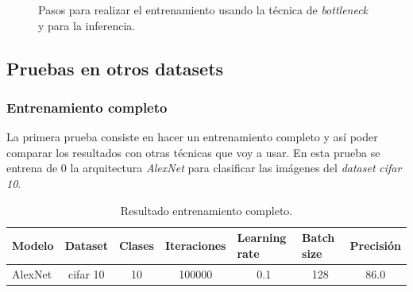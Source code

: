 \documentclass[12pt,a4paper]{article}
\begin{document}
\begin{figure}[H]
\centering
{}%
\qquad
{}%
\caption{Pasos para realizar el entrenamiento usando la técnica de \textit{bottleneck} y para la inferencia.}
\end{figure}

\subsection{Pruebas en otros datasets}
\subsubsection{Entrenamiento completo}
La primera prueba consiste en hacer un entrenamiento completo y así poder comparar los resultados con otras técnicas que voy a usar. En esta prueba se entrena de 0 la arquitectura \textit{AlexNet} para clasificar las imágenes del \textit{dataset} \textit{cifar 10}.

\begin{table}[H]
\centering
\begin{tabular}{|l|l|l|l|l|l|l|}
\hline
\textbf{Modelo} & \textbf{Dataset}              & \textbf{Clases}         & \textbf{Iteraciones}        & \textbf{Learning rate}   & \textbf{Batch size}      & \textbf{Precisión}        \\ \hline
AlexNet         & \multicolumn{1}{c|}{cifar 10} & \multicolumn{1}{c|}{10} & \multicolumn{1}{c|}{100000} & \multicolumn{1}{c|}{0.1} & \multicolumn{1}{c|}{128} & \multicolumn{1}{c|}{86.0} \\ \hline
\end{tabular}
\caption{Resultado entrenamiento completo.}
\end{table}
\end{document}
